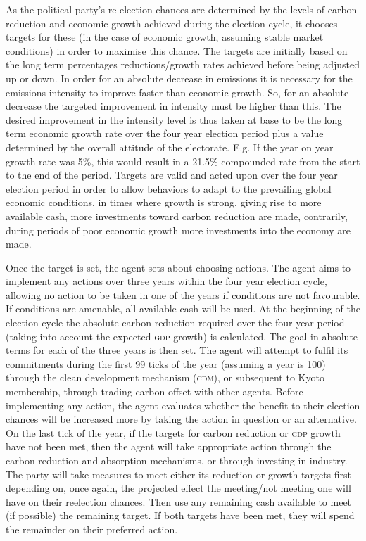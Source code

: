 As the political party's re-election chances are determined by the levels of carbon reduction and economic growth achieved during the election cycle, it chooses targets for these (in the case of economic growth, assuming stable market conditions) in order to maximise this chance. The targets are initially based on the long term percentages reductions/growth rates achieved before being adjusted up or down. In order for an absolute decrease in emissions it is necessary for the emissions intensity to improve faster than economic growth. So, for an absolute decrease the targeted improvement in intensity must be higher than this. The desired improvement in the intensity level is thus taken at base to be the long term economic growth rate over the four year election period plus a value determined by the overall attitude of the electorate. E.g. If the year on year growth rate was 5\%, this would result in a 21.5\% compounded rate from the start to the end of the period. Targets are valid and acted upon over the four year election period in order to allow behaviors to adapt to the prevailing global economic conditions, in times where growth is strong, giving rise to more available cash, more investments toward carbon reduction are made, contrarily, during periods of poor economic growth more investments into the economy are made. 

Once the target is set, the agent sets about choosing actions. The agent aims to implement any actions over three years within the four year election cycle, allowing no action to be taken in one of the years if conditions are not favourable. If conditions are amenable, all available cash will be used. At the beginning of the election cycle the absolute carbon reduction required over the four year period (taking into account the expected \textsc{gdp} growth) is calculated. The goal in absolute terms for each of the three years is then set. The agent will attempt to fulfil its commitments during the first 99 ticks of the year (assuming a year is 100) through the clean development mechanism (\textsc{cdm}), or subsequent to Kyoto membership, through trading carbon offset with other agents. Before implementing any action, the agent evaluates whether the benefit to their election chances will be increased more by taking the action in question or an alternative. On the last tick of the year, if the targets for carbon reduction or \textsc{gdp} growth have not been met, then the agent will take appropriate action through the carbon reduction and absorption mechanisms, or through investing in industry. The party will take measures to meet either its reduction or growth targets first depending on, once again, the projected effect the meeting/not meeting one will have on their reelection chances. Then use any remaining cash available to meet (if possible) the remaining target. If both targets have been met, they will spend the remainder on their preferred action.


